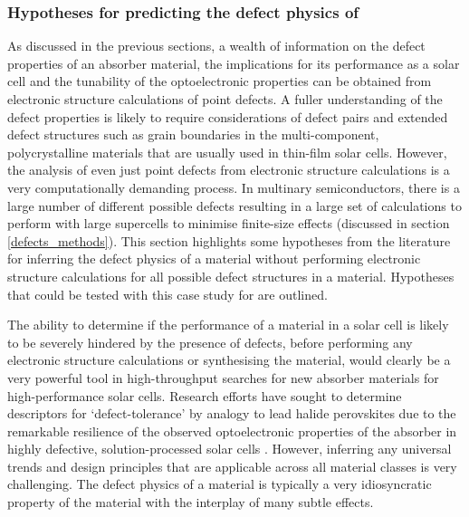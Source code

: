 \documentclass[11pt, twoside]{report}
\begin{document}
\subsubsection{Hypotheses for predicting the defect physics of {\enargite}}
As discussed in the previous sections, a wealth of information on the defect properties of an absorber material, the implications for its performance as a solar cell and the tunability of the optoelectronic properties can be obtained from electronic structure calculations of point defects. A fuller understanding of the defect properties is likely to require considerations of defect pairs and extended defect structures such as grain boundaries in the multi-component, polycrystalline materials that are usually used in thin-film solar cells.
However, the analysis of even just point defects from electronic structure calculations is a very computationally demanding process.
In multinary semiconductors, there is a large number of different possible defects resulting in a large set of calculations to perform with large supercells to minimise finite-size effects (discussed in section \ref{defects_methods}). This section highlights some hypotheses from the literature for inferring the defect physics of a material without performing electronic structure calculations for all possible defect structures in a material. Hypotheses that could be tested with this case study for {\enargite} are outlined. 

The ability to determine if the performance of a material in a solar cell is likely to be severely hindered by the presence of defects, before performing any electronic structure calculations or synthesising the material, would clearly be a very powerful tool in high-throughput searches for new absorber materials for high-performance solar cells. Research efforts have sought to determine descriptors for `defect-tolerance' by analogy to lead halide perovskites \cite{MIT_defect_tolerance} due to the remarkable resilience of the observed optoelectronic properties of the absorber in highly defective, solution-processed solar cells \cite{MAPI_defect_tolerance_Berry, MAPI_defect_phys}. However, inferring any universal trends and design principles that are applicable across all material classes is very challenging. The defect physics of a material is typically a very idiosyncratic property of the material with the interplay of many subtle effects.
\end{document}
